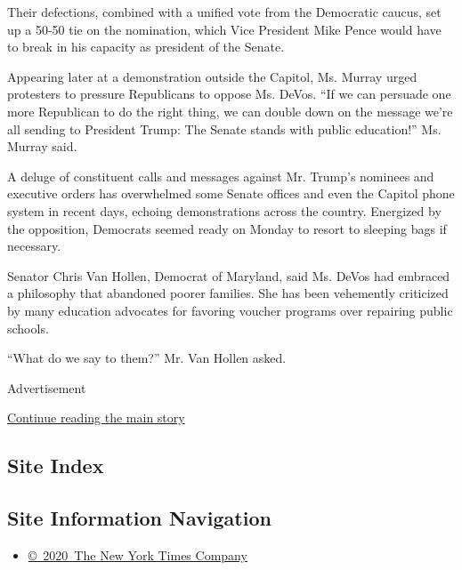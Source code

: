 Their defections, combined with a unified vote from the Democratic
caucus, set up a 50-50 tie on the nomination, which Vice President Mike
Pence would have to break in his capacity as president of the Senate.

Appearing later at a demonstration outside the Capitol, Ms. Murray urged
protesters to pressure Republicans to oppose Ms. DeVos. ``If we can
persuade one more Republican to do the right thing, we can double down
on the message we're all sending to President Trump: The Senate stands
with public education!'' Ms. Murray said.

A deluge of constituent calls and messages against Mr. Trump's nominees
and executive orders has overwhelmed some Senate offices and even the
Capitol phone system in recent days, echoing demonstrations across the
country. Energized by the opposition, Democrats seemed ready on Monday
to resort to sleeping bags if necessary.

Senator Chris Van Hollen, Democrat of Maryland, said Ms. DeVos had
embraced a philosophy that abandoned poorer families. She has been
vehemently criticized by many education advocates for favoring voucher
programs over repairing public schools.

``What do we say to them?'' Mr. Van Hollen asked.

Advertisement

\protect\hyperlink{after-bottom}{Continue reading the main story}

\hypertarget{site-index}{%
\subsection{Site Index}\label{site-index}}

\hypertarget{site-information-navigation}{%
\subsection{Site Information
Navigation}\label{site-information-navigation}}

\begin{itemize}
\tightlist
\item
  \href{https://help.nytimes.com/hc/en-us/articles/115014792127-Copyright-notice}{©~2020~The
  New York Times Company}
\end{itemize}

